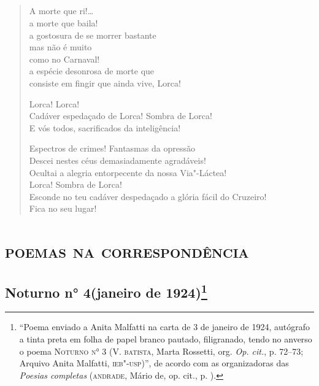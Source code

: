 \pagebreak
\section[A morte que ri!]{}

\begin{verse}
A morte que ri!\ldots{}\footnotemark\\
a morte que baila!\\
a gostosura de se morrer bastante\\
mas não é muito\\
como no Carnaval!\\
a espécie desonrosa de morte que\\
consiste em fingir que ainda vive, Lorca!

Lorca! Lorca!\\
Cadáver espedaçado de Lorca! Sombra de Lorca!\\
E vós todos, sacrificados da inteligência!

Espectros de crimes! Fantasmas da opressão\\
Descei nestes céus demasiadamente agradáveis!\\
Ocultai a alegria entorpecente da nossa Via"-Láctea!\\
Lorca! Sombra de Lorca!\\
Esconde no teu cadáver despedaçado a glória fácil do Cruzeiro!\\
Fica no seu lugar!
\end{verse}


\chapter{\textsc{poemas na correspondência}}

\section[Noturno n° 4]{Noturno n° 4\break(janeiro de 1924)\footnote[*]{``Poema enviado a Anita Malfatti na carta de 3 de janeiro de 1924, autógrafo a tinta preta em folha de papel
  branco pautado, filigranado, tendo no anverso o poema \textsc{Noturno
  n° 3} (V. \textsc{batista}, Marta Rossetti, org. \emph{Op. cit.}, p. 72--73;
  Arquivo Anita Malfatti, \textsc{ieb"-usp})'', de acordo com as organizadoras das
  \emph{Poesias completas} (\textsc{andrade}, Mário de, op. cit., p. ).}}


